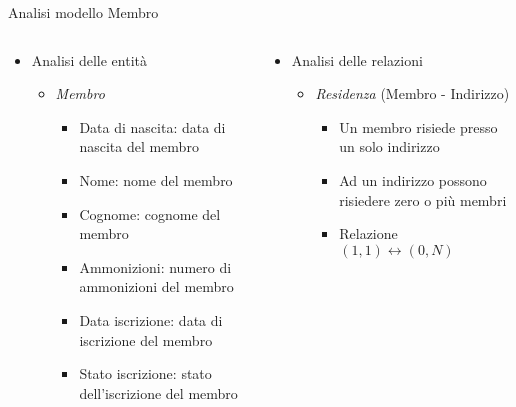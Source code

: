 \begin{frame}{Analisi modello Membro}
    \begin{columns}[c]
        \begin{column}[T]{.45\textwidth}
            \begin{itemize}
                \item Analisi delle entità
                    \begin{itemize}
                        \item \textit{Membro}
                            \begin{itemize}
                                \item Data di nascita: data di nascita del membro
                                \item Nome: nome del membro
                                \item Cognome: cognome del membro
                                \item Ammonizioni: numero di ammonizioni del membro
                                \item Data iscrizione: data di iscrizione del membro
                                \item Stato iscrizione: stato dell'iscrizione del membro
                            \end{itemize}
                    \end{itemize}
            \end{itemize}
        \end{column}
        \begin{column}[T]{.5\textwidth}
            \begin{itemize}
                \item Analisi delle relazioni
                    \begin{itemize}
                        \item \textit{Residenza} (Membro - Indirizzo)
                            \begin{itemize}
                                \item Un membro risiede presso un solo indirizzo
                                \item Ad un indirizzo possono risiedere zero o più membri
                                \item Relazione $(1,1) \leftrightarrow (0,N)$
                            \end{itemize}
                    \end{itemize}
            \end{itemize}
        \end{column}
    \end{columns}
\end{frame}

